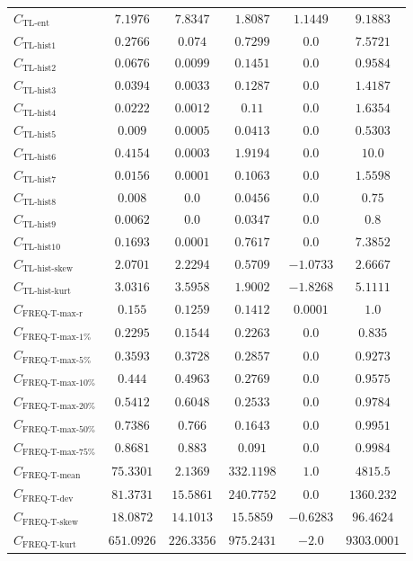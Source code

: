 \documentclass{standalone}
\newcommand{\tlentropyname}{\text{TL-ent}}
\newcommand{\tlentropy}{C_{\tlentropyname}}
\newcommand{\tlhistonename}{\text{TL-hist1}}
\newcommand{\tlhistone}{C_{\tlhistonename}}
\newcommand{\tlhisttwoname}{\text{TL-hist2}}
\newcommand{\tlhisttwo}{C_{\tlhisttwoname}}
\newcommand{\tlhistthreename}{\text{TL-hist3}}
\newcommand{\tlhistthree}{C_{\tlhistthreename}}
\newcommand{\tlhistfourname}{\text{TL-hist4}}
\newcommand{\tlhistfour}{C_{\tlhistfourname}}
\newcommand{\tlhistfivename}{\text{TL-hist5}}
\newcommand{\tlhistfive}{C_{\tlhistfivename}}
\newcommand{\tlhistsixname}{\text{TL-hist6}}
\newcommand{\tlhistsix}{C_{\tlhistsixname}}
\newcommand{\tlhistsevenname}{\text{TL-hist7}}
\newcommand{\tlhistseven}{C_{\tlhistsevenname}}
\newcommand{\tlhisteightname}{\text{TL-hist8}}
\newcommand{\tlhisteight}{C_{\tlhisteightname}}
\newcommand{\tlhistninename}{\text{TL-hist9}}
\newcommand{\tlhistnine}{C_{\tlhistninename}}
\newcommand{\tlhisttenname}{\text{TL-hist10}}
\newcommand{\tlhistten}{C_{\tlhisttenname}}
\newcommand{\tlskewhistname}{\text{TL-hist-skew}}
\newcommand{\tlskewhist}{C_{\tlskewhistname}}
\newcommand{\tlkurthistname}{\text{TL-hist-kurt}}
\newcommand{\tlkurthist}{C_{\tlkurthistname}}
\newcommand{\freqmaxrname}{\text{FREQ-T-max-r}}
\newcommand{\freqmaxr}{C_{\freqmaxrname}}
\newcommand{\freqmaxonename}{\text{FREQ-T-max-1\%}}
\newcommand{\freqmaxone}{C_{\freqmaxonename}}
\newcommand{\freqmaxfivename}{\text{FREQ-T-max-5\%}}
\newcommand{\freqmaxfive}{C_{\freqmaxfivename}}
\newcommand{\freqmaxtenname}{\text{FREQ-T-max-10\%}}
\newcommand{\freqmaxten}{C_{\freqmaxtenname}}
\newcommand{\freqmaxtwentyname}{\text{FREQ-T-max-20\%}}
\newcommand{\freqmaxtwenty}{C_{\freqmaxtwentyname}}
\newcommand{\freqmaxfiftyname}{\text{FREQ-T-max-50\%}}
\newcommand{\freqmaxfifty}{C_{\freqmaxfiftyname}}
\newcommand{\freqmaxseventyfivename}{\text{FREQ-T-max-75\%}}
\newcommand{\freqmaxseventyfive}{C_{\freqmaxseventyfivename}}
\newcommand{\freqmeanname}{\text{FREQ-T-mean}}
\newcommand{\freqmean}{C_{\freqmeanname}}
\newcommand{\freqdevname}{\text{FREQ-T-dev}}
\newcommand{\freqdev}{C_{\freqdevname}}
\newcommand{\freqskewname}{\text{FREQ-T-skew}}
\newcommand{\freqskew}{C_{\freqskewname}}
\newcommand{\freqkurtname}{\text{FREQ-T-kurt}}
\newcommand{\freqkurt}{C_{\freqkurtname}}
\begin{document}
\begin{tabular}{lccccc}
$\tlentropy$ & $7.1976$ & $7.8347$ & $1.8087$ & $1.1449$ & $9.1883$ \\ 
$\tlhistone$ & $0.2766$ & $0.074$ & $0.7299$ & $0.0$ & $7.5721$ \\ 
$\tlhisttwo$ & $0.0676$ & $0.0099$ & $0.1451$ & $0.0$ & $0.9584$ \\ 
$\tlhistthree$ & $0.0394$ & $0.0033$ & $0.1287$ & $0.0$ & $1.4187$ \\ 
$\tlhistfour$ & $0.0222$ & $0.0012$ & $0.11$ & $0.0$ & $1.6354$ \\ 
$\tlhistfive$ & $0.009$ & $0.0005$ & $0.0413$ & $0.0$ & $0.5303$ \\ 
$\tlhistsix$ & $0.4154$ & $0.0003$ & $1.9194$ & $0.0$ & $10.0$ \\ 
$\tlhistseven$ & $0.0156$ & $0.0001$ & $0.1063$ & $0.0$ & $1.5598$ \\ 
$\tlhisteight$ & $0.008$ & $0.0$ & $0.0456$ & $0.0$ & $0.75$ \\ 
$\tlhistnine$ & $0.0062$ & $0.0$ & $0.0347$ & $0.0$ & $0.8$ \\ 
$\tlhistten$ & $0.1693$ & $0.0001$ & $0.7617$ & $0.0$ & $7.3852$ \\ 
$\tlskewhist$ & $2.0701$ & $2.2294$ & $0.5709$ & $-1.0733$ & $2.6667$ \\ 
$\tlkurthist$ & $3.0316$ & $3.5958$ & $1.9002$ & $-1.8268$ & $5.1111$ \\ 
$\freqmaxr$ & $0.155$ & $0.1259$ & $0.1412$ & $0.0001$ & $1.0$ \\ 
$\freqmaxone$ & $0.2295$ & $0.1544$ & $0.2263$ & $0.0$ & $0.835$ \\ 
$\freqmaxfive$ & $0.3593$ & $0.3728$ & $0.2857$ & $0.0$ & $0.9273$ \\ 
$\freqmaxten$ & $0.444$ & $0.4963$ & $0.2769$ & $0.0$ & $0.9575$ \\ 
$\freqmaxtwenty$ & $0.5412$ & $0.6048$ & $0.2533$ & $0.0$ & $0.9784$ \\ 
$\freqmaxfifty$ & $0.7386$ & $0.766$ & $0.1643$ & $0.0$ & $0.9951$ \\ 
$\freqmaxseventyfive$ & $0.8681$ & $0.883$ & $0.091$ & $0.0$ & $0.9984$ \\ 
$\freqmean$ & $75.3301$ & $2.1369$ & $332.1198$ & $1.0$ & $4815.5$ \\ 
$\freqdev$ & $81.3731$ & $15.5861$ & $240.7752$ & $0.0$ & $1360.232$ \\ 
$\freqskew$ & $18.0872$ & $14.1013$ & $15.5859$ & $-0.6283$ & $96.4624$ \\ 
$\freqkurt$ & $651.0926$ & $226.3356$ & $975.2431$ & $-2.0$ & $9303.0001$ \\ 

\end{tabular}
\end{document}
